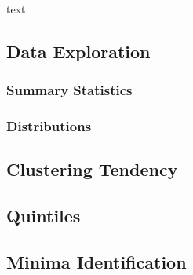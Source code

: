 \documentclass[11pt, a4paper]{article}
\begin{document}
text







\subsection{Data Exploration}

\subsubsection{Summary Statistics}













\subsubsection{Distributions}




















\subsection{Clustering Tendency}













\subsection{Quintiles}













\subsection{Minima Identification}
\end{document}
